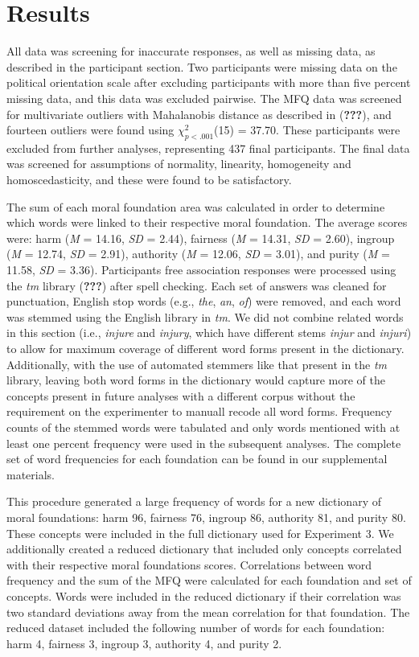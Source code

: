 \documentclass[english,man]{apa6}
\theoremstyle{definition}
\theoremstyle{definition}
\theoremstyle{definition}
\theoremstyle{remark}
\begin{document}
\section{Results}\label{results}

All data was screening for inaccurate responses, as well as missing
data, as described in the participant section. Two participants were
missing data on the political orientation scale after excluding
participants with more than five percent missing data, and this data was
excluded pairwise. The MFQ data was screened for multivariate outliers
with Mahalanobis distance as described in ({\textbf{???}}), and fourteen
outliers were found using \(\chi^2_{p < .001}\)(15) = 37.70. These
participants were excluded from further analyses, representing 437 final
participants. The final data was screened for assumptions of normality,
linearity, homogeneity and homoscedasticity, and these were found to be
satisfactory.

The sum of each moral foundation area was calculated in order to
determine which words were linked to their respective moral foundation.
The average scores were: harm (\emph{M} = 14.16, \emph{SD} = 2.44),
fairness (\emph{M} = 14.31, \emph{SD} = 2.60), ingroup (\emph{M} =
12.74, \emph{SD} = 2.91), authority (\emph{M} = 12.06, \emph{SD} =
3.01), and purity (\emph{M} = 11.58, \emph{SD} = 3.36). Participants
free association responses were processed using the \emph{tm} library
({\textbf{???}}) after spell checking. Each set of answers was cleaned
for punctuation, English stop words (e.g., \emph{the}, \emph{an},
\emph{of}) were removed, and each word was stemmed using the English
library in \emph{tm}. We did not combine related words in this section
(i.e., \emph{injure} and \emph{injury}, which have different stems
\emph{injur} and \emph{injuri}) to allow for maximum coverage of
different word forms present in the dictionary. Additionally, with the
use of automated stemmers like that present in the \emph{tm} library,
leaving both word forms in the dictionary would capture more of the
concepts present in future analyses with a different corpus without the
requirement on the experimenter to manuall recode all word forms.
Frequency counts of the stemmed words were tabulated and only words
mentioned with at least one percent frequency were used in the
subsequent analyses. The complete set of word frequencies for each
foundation can be found in our supplemental materials.

This procedure generated a large frequency of words for a new dictionary
of moral foundations: harm 96, fairness 76, ingroup 86, authority 81,
and purity 80. These concepts were included in the full dictionary used
for Experiment 3. We additionally created a reduced dictionary that
included only concepts correlated with their respective moral
foundations scores. Correlations between word frequency and the sum of
the MFQ were calculated for each foundation and set of concepts. Words
were included in the reduced dictionary if their correlation was two
standard deviations away from the mean correlation for that foundation.
The reduced dataset included the following number of words for each
foundation: harm 4, fairness 3, ingroup 3, authority 4, and purity 2.
\end{document}
